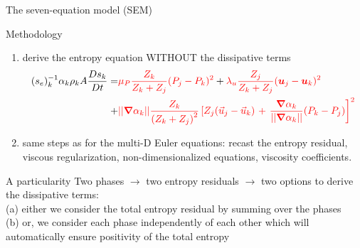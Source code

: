 \documentclass[xcolor=dvipsnames,10pt]{beamer}
\newcommand{\grad}{\boldsymbol{\nabla}}
\newcommand{\mbold}[1]{\boldsymbol#1}
\begin{document}
\begin{frame}{The seven-equation model (SEM)}
\begin{block}{Methodology}
\begin{enumerate}
\item derive the entropy equation WITHOUT the dissipative terms
\begin{align}
(s_e)_k^{-1} \alpha_k \rho_k A \frac{D s_k}{Dt} =& \textcolor{red}{\mu_P \frac{Z_k}{Z_k+Z_j} (P_j - P_k)^2} +
\textcolor{red}{ \lambda_u \frac{Z_j}{Z_k+Z_j} (\mbold u_j - \mbold u_k)^2} \nonumber \\ 
+& \textcolor{red}{|| \grad \alpha_k || \frac{Z_k }{\left( Z_k+Z_j \right)^2} \left[ Z_j (\vec{u}_j-\vec{u}_k)\right.+\left. \frac{\grad \alpha_k}{|| \grad \alpha_k ||}(P_k-P_j)\right]^2 }\nonumber
\end{align}
\item same steps as for the multi-D Euler equations: recast the entropy residual, viscous regularization, non-dimensionalized equations, viscosity coefficients.
\end{enumerate}
\end{block}
\begin{block}{A particularity}
Two phases $\to$ two entropy residuals $\to$ two options to derive the dissipative terms: \\
(a) either we consider the total entropy residual by summing over the phases \\
(b) or, we consider each phase independently of each other which will automatically ensure positivity of the total entropy \\
\end{block}
\end{frame}
\end{document}
